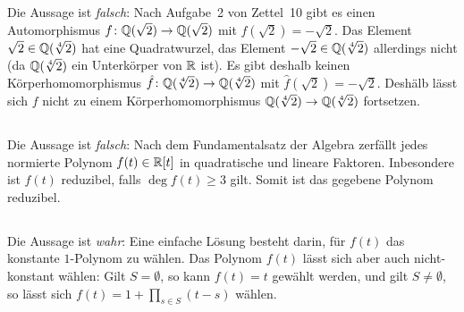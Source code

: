 \section{}





\subsection{}

Die Aussage ist \emph{falsch}:
Nach Aufgabe~2 von Zettel~10 gibt es einen Automorphismus $f \colon \mathbb{Q}(\sqrt{2}) \to \mathbb{Q}(\sqrt{2})$ mit $f(\sqrt{2}) = -\sqrt{2}$.
Das Element $\sqrt{2} \in \mathbb{Q}(\sqrt[4]{2})$ hat eine Quadratwurzel, das Element $-\sqrt{2} \in \mathbb{Q}(\sqrt[4]{2})$ allerdings nicht (da $\mathbb{Q}(\sqrt[4]{2})$ ein Unterkörper von $\mathbb{R}$ ist).
Es gibt deshalb keinen Körperhomomorphismus $\hat{f} \colon \mathbb{Q}(\sqrt[4]{2}) \to \mathbb{Q}(\sqrt[4]{2})$ mit $\hat{f}(\sqrt{2}) = -\sqrt{2}$.
Deshälb lässt sich $f$ nicht zu einem Körperhomomorphismus $\mathbb{Q}(\sqrt[4]{2}) \to \mathbb{Q}(\sqrt[4]{2})$ fortsetzen.





\subsection{}

Die Aussage ist \emph{falsch}:
Nach dem Fundamentalsatz der Algebra zerfällt jedes normierte Polynom $f(t) \in \mathbb{R}[t]$ in quadratische und lineare Faktoren.
Inbesondere ist $f(t)$ reduzibel, falls $\deg f(t) \geq 3$ gilt.
Somit ist das gegebene Polynom reduzibel.





\subsection{}

Die Aussage ist \emph{wahr}:
Eine einfache Lösung besteht darin, für $f(t)$ das konstante $1$-Polynom zu wählen.
Das Polynom $f(t)$ lässt sich aber auch nicht-konstant wählen:
Gilt $S = \emptyset$, so kann $f(t) = t$ gewählt werden, und gilt $S \neq \emptyset$, so lässt sich $f(t) = 1 + \prod_{s \in S} (t-s)$ wählen.





\subsection{}

